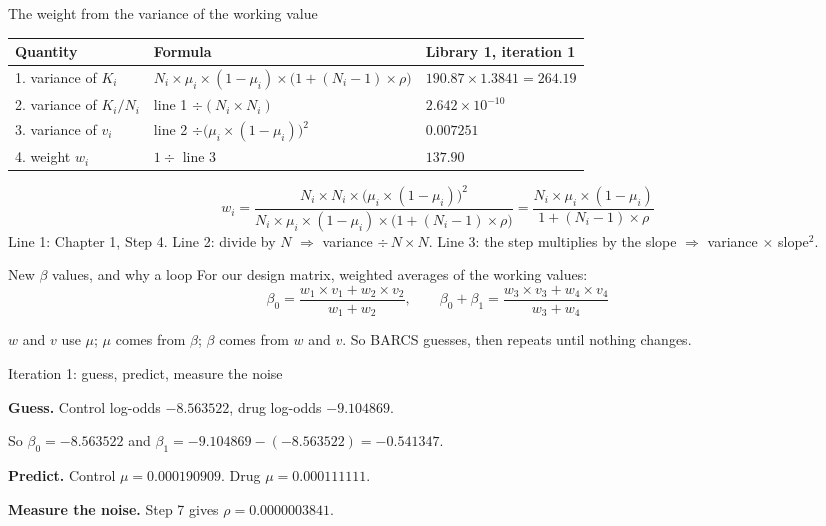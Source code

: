 \documentclass[aspectratio=169,11pt]{beamer}
\begin{document}
\begin{frame}{The weight from the variance of the working value}
\small
\renewcommand{\arraystretch}{1.3}\setlength{\tabcolsep}{4pt}
\begin{tabular}{@{}l l l@{}}
\toprule
Quantity & Formula & Library 1, iteration 1\\
\midrule
1. variance of $K_i$ & $N_i \times \mu_i \times (1-\mu_i) \times \bigl(1 + (N_i-1) \times \rho\bigr)$ & $190.87 \times 1.3841 = 264.19$\\
2. variance of $K_i/N_i$ & line 1 $\div (N_i \times N_i)$ & $2.642 \times 10^{-10}$\\
3. variance of $v_i$ & line 2 $\div \bigl(\mu_i \times (1-\mu_i)\bigr)^2$ & $0.007251$\\
4. weight $w_i$ & $1 \div$ line 3 & $137.90$\\
\bottomrule
\end{tabular}
\normalsize
\[
w_i = \frac{N_i \times N_i \times \bigl(\mu_i \times (1-\mu_i)\bigr)^2}
        {N_i \times \mu_i \times (1-\mu_i) \times \bigl(1 + (N_i-1) \times \rho\bigr)}
 = \frac{N_i \times \mu_i \times (1-\mu_i)}{1 + (N_i - 1) \times \rho}
\]
{\small Line 1: Chapter 1, Step 4. Line 2: divide by $N$ $\Rightarrow$
variance $\div\, N \times N$. Line 3: the step multiplies by the slope
$\Rightarrow$ variance $\times$ slope$^2$.}
\end{frame}

\begin{frame}{New $\beta$ values, and why a loop}
For our design matrix, weighted averages of the working values:
\[
\beta_0 = \frac{w_1 \times v_1 + w_2 \times v_2}{w_1 + w_2}, \qquad
\beta_0 + \beta_1 = \frac{w_3 \times v_3 + w_4 \times v_4}{w_3 + w_4}
\]
\begin{remember}
$w$ and $v$ use $\mu$; $\mu$ comes from $\beta$; $\beta$ comes from $w$ and
$v$. So BARCS guesses, then repeats until nothing changes.
\end{remember}
\end{frame}

\begin{frame}{Iteration 1: guess, predict, measure the noise}
\begin{worked}[ 10a: iteration 1]
\textbf{Guess.} Control log-odds $-8.563522$, drug log-odds $-9.104869$.

So $\beta_0 = -8.563522$ and $\beta_1 = -9.104869 - (-8.563522) = -0.541347$.

\medskip
\textbf{Predict.} Control $\mu = 0.000190909$. Drug $\mu = 0.000111111$.

\medskip
\textbf{Measure the noise.} Step 7 gives $\rho = 0.0000003841$.
\end{worked}
\end{frame}
\end{document}
